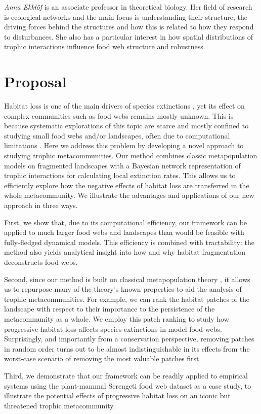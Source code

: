 \documentclass[11pt]{article}
\begin{document}
\textit{Anna Ekkl\"of} is an associate professor in theoretical biology. Her field of research is ecological networks and the main focus is understanding their structure, the driving forces behind the structures and how this is related to how they respond to disturbances. She also has a particular interest in how spatial distributions of trophic interactions influence food web structure and robustness.


\newpage


\section*{Proposal}

Habitat loss is one of the main drivers of species extinctions \citep{Tylianakis2008, Haddad2015}, yet its effect on complex communities such as food webs remains mostly unknown. This is because systematic explorations of this topic are scarce \citep{Pillai2011, Eklof2012} and mostly confined to studying small food webs and/or landscapes, often due to computational limitations \citep{Liao2016, Liao2017JAE, Liao2017RSPB, Ryser2019}. Here we address this problem by developing a novel approach to studying trophic metacommunities. Our method combines classic metapopulation models \cite{HanskiOvaskainen2000, OvaskainenHanski2001, HanskiOvaskainen2003} on fragmented landscapes with a Bayesian network representation \cite{Eklofetal2013MEE} of trophic interactions for calculating local extinction rates. This allows us to efficiently explore how the negative effects of habitat loss are transferred in the whole metacommunity. We illustrate the advantages and applications of our new approach in three ways.

First, we show that, due to its computational efficiency, our framework can be applied to much larger food webs and landscapes than would be feasible with fully-fledged dynamical models. This efficiency is combined with tractability: the method also yields analytical insight into how and why habitat fragmentation deconstructs food webs.

Second, since our method is built on classical metapopulation theory \cite{OvaskainenHanski2001}, it allows us to repurpose many of the theory's known properties to aid the analysis of trophic metacommunities. For example, we can rank the habitat patches of the landscape with respect to their importance to the persistence of the metacommunity as a whole. We employ this patch ranking to study how progressive habitat loss affects species extinctions in model food webs. Surprisingly, and importantly from a conservation perspective, removing patches in random order turns out to be almost indistinguishable in its effects from the worst-case scenario of removing the most valuable patches first.

Third, we demonstrate that our framework can be readily applied to empirical systems using the plant-mammal Serengeti food web dataset \cite{Baskerville2011} as a case study, to illustrate the potential effects of progressive habitat loss on an iconic but threatened trophic metacommunity. 




\end{document}
